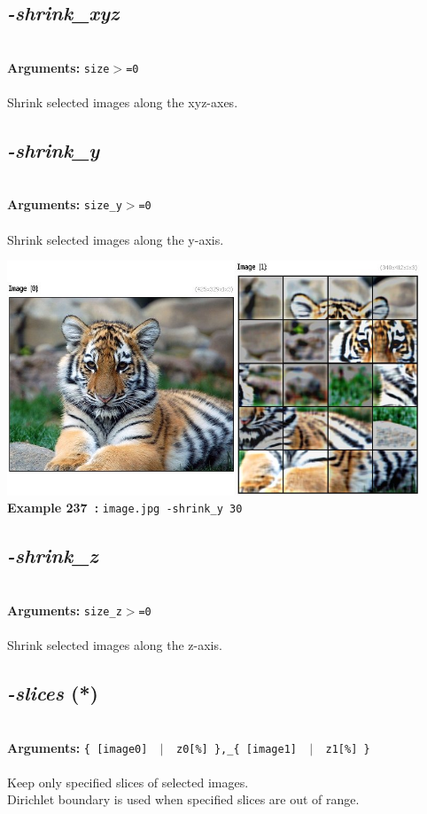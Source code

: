 \documentclass[a4paper,11pt,twoside]{book}
\begin{document}
\subsection{\emph{-shrink\_xyz} }\vspace*{-0.5em}
~\\\textbf{Arguments: } 
{\small \texttt{size$>$=0}}\\~\\
Shrink selected images along the xyz-axes.


\subsection{\emph{-shrink\_y} }\vspace*{-0.5em}
~\\\textbf{Arguments: } 
{\small \texttt{size\_y$>$=0}}\\~\\
Shrink selected images along the y-axis.
\begin{center}\includegraphics[keepaspectratio=true,height=7cm,width=\textwidth]{img/gmic_def237.jpg}\\
{\footnotesize \textbf{Example 237~:} \texttt{image.jpg -shrink\_y 30}}
\end{center}

\subsection{\emph{-shrink\_z} }\vspace*{-0.5em}
~\\\textbf{Arguments: } 
{\small \texttt{size\_z$>$=0}}\\~\\
Shrink selected images along the z-axis.


\subsection{\emph{-slices} (*)}\vspace*{-0.5em}
~\\\textbf{Arguments: } 
{\small \texttt{\{ [image0] ~$|$~ z0[\%] \},\_\{ [image1] ~$|$~ z1[\%] \}}}\\~\\
Keep only specified slices of selected images.
~\\Dirichlet boundary is used when specified slices are out of range.
\end{document}
